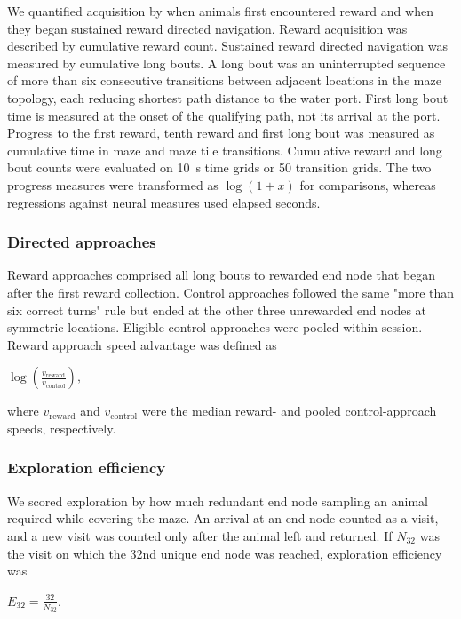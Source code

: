 \documentclass[fleqn,10pt]{wlscirep}
\begin{document}
We quantified acquisition by when animals first encountered reward and when they began sustained reward directed navigation. Reward acquisition was described by cumulative reward count. Sustained reward directed navigation was measured by cumulative long bouts. A long bout was an uninterrupted sequence of more than six consecutive transitions between adjacent locations in the maze topology, each reducing shortest path distance to the water port. First long bout time is measured at the onset of the qualifying path, not its arrival at the port. Progress to the first reward, tenth reward and first long bout was measured as cumulative time in maze and maze tile transitions. Cumulative reward and long bout counts were evaluated on 10~s time grids or 50 transition grids. The two progress measures were transformed as $\log(1+x)$ for comparisons, whereas regressions against neural measures used elapsed seconds.

\subsubsection*{Directed approaches}

Reward approaches comprised all long bouts to rewarded end node that began after the first reward collection. Control approaches followed the same "more than six correct turns" rule but ended at the other three unrewarded end nodes at symmetric locations. Eligible control approaches were pooled within session. Reward approach speed advantage was defined as
\begin{center}
\(
\log\left(\frac{v_{\mathrm{reward}}}{v_{\mathrm{control}}}\right),
\)
\end{center}
where $v_{\mathrm{reward}}$ and $v_{\mathrm{control}}$ were the median reward- and pooled control-approach speeds, respectively.

\subsubsection*{Exploration efficiency}

We scored exploration by how much redundant end node sampling an animal required while covering the maze. An arrival at an end node counted as a visit, and a new visit was counted only after the animal left and returned. If $N_{32}$ was the visit on which the 32nd unique end node was reached, exploration efficiency was
\begin{center}
\(
E_{32}=\frac{32}{N_{32}}.
\)
\end{center}
\end{document}
